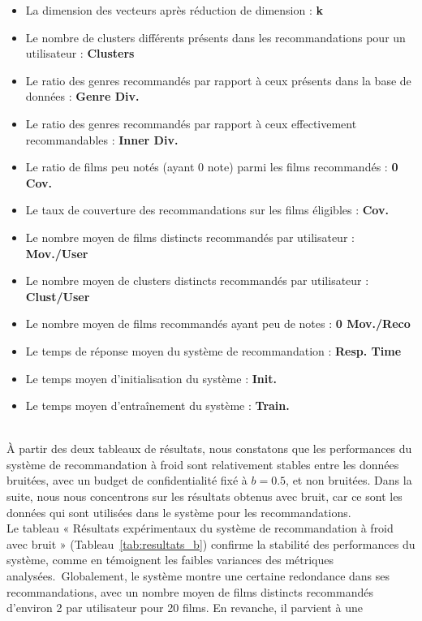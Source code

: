 \documentclass{article}
\begin{document}
\begin{itemize}
    \item La dimension des vecteurs après réduction de dimension : \textbf{k}
    \item Le nombre de clusters différents présents dans les recommandations pour un utilisateur : \textbf{Clusters}
    \item Le ratio des genres recommandés par rapport à ceux présents dans la base de données : \textbf{Genre Div.}
    \item Le ratio des genres recommandés par rapport à ceux effectivement recommandables : \textbf{Inner Div.}
    \item Le ratio de films peu notés (ayant 0 note) parmi les films recommandés : \textbf{0 Cov.}
    \item Le taux de couverture des recommandations sur les films éligibles : \textbf{Cov.}
    \item Le nombre moyen de films distincts recommandés par utilisateur : \textbf{Mov./User}
    \item Le nombre moyen de clusters distincts recommandés par utilisateur : \textbf{Clust/User}
    \item Le nombre moyen de films recommandés ayant peu de notes : \textbf{0 Mov./Reco}
    \item Le temps de réponse moyen du système de recommandation : \textbf{Resp. Time}
    \item Le temps moyen d’initialisation du système : \textbf{Init.}
    \item Le temps moyen d’entraînement du système : \textbf{Train.}
\end{itemize}
$ $\\
À partir des deux tableaux de résultats, nous constatons que les performances du système
de recommandation à froid sont relativement stables entre les données bruitées, avec un budget de confidentialité fixé à $b = 0.5$, et non bruitées. Dans
la suite, nous nous concentrons sur les résultats obtenus avec bruit, car ce sont les données qui
sont utilisées dans le système pour les recommandations.\\
Le tableau « Résultats expérimentaux du système de recommandation à froid avec bruit » (Tableau~\ref{tab:resultats_b}) confirme la stabilité des performances
du système, comme en témoignent les faibles variances des métriques analysées.\
Globalement, le système montre une certaine redondance dans ses recommandations, avec un nombre moyen de films
distincts recommandés d’environ 2 par utilisateur pour 20 films. En revanche, il parvient à une
\end{document}
